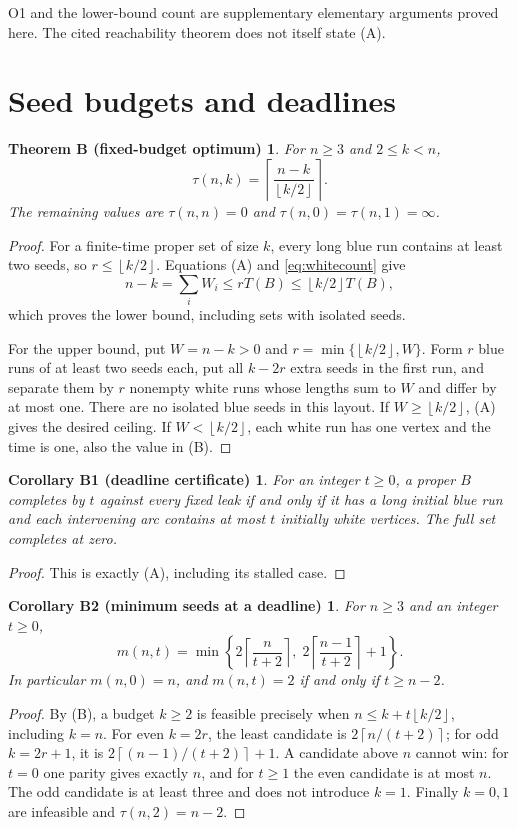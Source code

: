 \documentclass[11pt,a4paper]{article}
\newcommand{\ceil}[1]{\left\lceil #1\right\rceil}
\newcommand{\floor}[1]{\left\lfloor #1\right\rfloor}
\newtheorem*{theoremB}{Theorem B (fixed-budget optimum)}
\newtheorem*{corB1}{Corollary B1 (deadline certificate)}
\newtheorem*{corB2}{Corollary B2 (minimum seeds at a deadline)}
\begin{document}
O1 and the lower-bound count are supplementary elementary arguments proved
here. The cited reachability theorem does not itself state (A).

\section{Seed budgets and deadlines}

\begin{theoremB}
For $n\geq3$ and $2\leq k<n$,
\begin{equation}
 \tau(n,k)=\ceil{\frac{n-k}{\floor{k/2}}}. \tag{B}\label{eq:B}
\end{equation}
The remaining values are $\tau(n,n)=0$ and
$\tau(n,0)=\tau(n,1)=\infty$.
\end{theoremB}
\begin{proof}
For a finite-time proper set of size $k$, every long blue run contains at
least two seeds, so $r\leq\floor{k/2}$. Equations (A) and
\eqref{eq:whitecount} give
\[
 n-k=\sum_iW_i\leq rT(B)\leq\floor{k/2}T(B),
\]
which proves the lower bound, including sets with isolated seeds.

For the upper bound, put $W=n-k>0$ and
$r=\min\{\floor{k/2},W\}$. Form $r$ blue runs of at least two seeds each,
put all $k-2r$ extra seeds in the first run, and separate them by $r$
nonempty white runs whose lengths sum to $W$ and differ by at most one.
There are no isolated blue seeds in this layout. If $W\geq\floor{k/2}$,
(A) gives the desired ceiling. If $W<\floor{k/2}$, each white run has one
vertex and the time is one, also the value in (B).
\end{proof}

\begin{corB1}
For an integer $t\geq0$, a proper $B$ completes by $t$ against every fixed
leak if and only if it has a long initial blue run and each intervening arc
contains at most $t$ initially white vertices. The full set completes at zero.
\end{corB1}
\begin{proof}
This is exactly (A), including its stalled case.
\end{proof}

\begin{corB2}
For $n\geq3$ and an integer $t\geq0$,
\begin{equation}
 m(n,t)=\min\left\{2\ceil{\frac{n}{t+2}},\;
  2\ceil{\frac{n-1}{t+2}}+1\right\}. \tag{C}\label{eq:C}
\end{equation}
In particular $m(n,0)=n$, and $m(n,t)=2$ if and only if $t\geq n-2$.
\end{corB2}
\begin{proof}
By (B), a budget $k\geq2$ is feasible precisely when
$n\leq k+t\floor{k/2}$, including $k=n$. For even $k=2r$, the least
candidate is $2\ceil{n/(t+2)}$; for odd $k=2r+1$, it is
$2\ceil{(n-1)/(t+2)}+1$. A candidate above $n$ cannot win: for $t=0$
one parity gives exactly $n$, and for $t\geq1$ the even candidate is at
most $n$. The odd candidate is at least three and does not introduce $k=1$.
Finally $k=0,1$ are infeasible and $\tau(n,2)=n-2$.
\end{proof}
\end{document}
